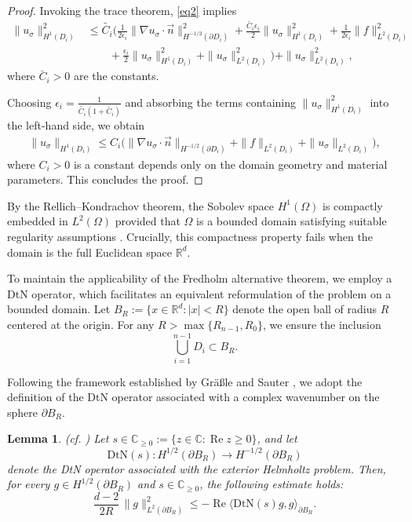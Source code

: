 \documentclass[12pt,reqno]{amsart}
\newtheorem{lemma}[theorem]{Lemma}
\renewcommand{\Re}{\operatorname{Re}}
\numberwithin{equation}{section}
\begin{document}
\begin{proof}
Invoking the trace theorem, \eqref{eq2} implies
\begin{align*}
\|u_\sigma\|_{H^1(D_i)}^2
&\leq \widetilde{C_i} \Bigg( \frac{1}{2\epsilon_i} \|\nabla u_\sigma \cdot \vec{n}\|_{H^{-1/2}(\partial D_i)}^2
+ \frac{\breve{C_i} \epsilon_i}{2} \|u_\sigma\|_{H^1(D_i)}^2
+ \frac{1}{2\epsilon_i} \|f\|_{L^2(D_i)}^2 \\
&\qquad + \frac{\epsilon_i}{2} \|u_\sigma\|_{H^1(D_i)}^2
+ \|u_\sigma\|_{L^2(D_i)}^2\Bigg)+\|u_\sigma\|_{L^2(D_i)}^2,
\end{align*}
where $\breve{C_i} > 0$ are the constants.


Choosing $\epsilon_i = \frac{1}{\widetilde{C_i}(1+\breve{C_i})}$ and absorbing the terms containing $\|u_\sigma\|_{H^1(D_i)}^2$ into the left-hand side, we obtain
\begin{align*}
\|u_\sigma\|_{H^1(D_i)} \leq C_i \Big( \|\nabla u_\sigma \cdot \vec{n}\|_{H^{-1/2}(\partial D_i)} + \|f\|_{L^2(D_i)} + \|u_\sigma\|_{L^2(D_i)} \Big),
\end{align*}
where $C_i > 0$ is a constant depends only on the domain geometry and material parameters. This concludes the proof.
\end{proof}




By the {Rellich--Kondrachov theorem}, the Sobolev space $H^1(\Omega)$ is compactly embedded in $L^2(\Omega)$ provided that $\Omega$ is a bounded domain satisfying suitable regularity assumptions \cite[Theorem 9.16]{brezis2010}. Crucially, this compactness property fails when the domain is the full Euclidean space $\mathbb{R}^d$.

To maintain the applicability of the {Fredholm alternative theorem}, we employ a  DtN operator, which facilitates an equivalent reformulation of the problem on a bounded domain. Let $B_{R} := \{ x \in \mathbb{R}^d : |x| < R \}$ denote the open ball of radius $R$ centered at the origin. For any $R > \max\{R_{n-1}, R_0\}$, we ensure the inclusion
\begin{equation}
    \bigcup_{i=1}^{n-1} D_i \subset B_{R}.
\end{equation}

Following the framework established by {Gräßle and Sauter} \cite{gräßle2025}, we adopt the definition of the DtN operator associated with a complex wavenumber on the sphere $\partial B_R$.




\begin{lemma}\label{lemm4} (cf. \cite[Theorem 3.4]{gräßle2025})
Let $s \in \mathbb{C}_{\ge 0} := \{ z \in \mathbb{C} : \Re z \ge 0 \}$, and let 
\[
\mathrm{DtN}(s) : H^{1/2}(\partial B_{R}) \to H^{-1/2}(\partial B_{R})
\]
denote the DtN operator associated with the exterior Helmholtz problem. Then, for every $g \in H^{1/2}(\partial B_{R})$ and $s \in \mathbb{C}_{\ge 0}$, the following estimate holds:
\[
\frac{d-2}{2R}\,\|g\|_{L^2(\partial B_{R})}^2 \le -\Re \bigl\langle \mathrm{DtN}(s) g , g \bigr\rangle_{\partial B_{R}}.
\]
\end{lemma}
\end{document}
